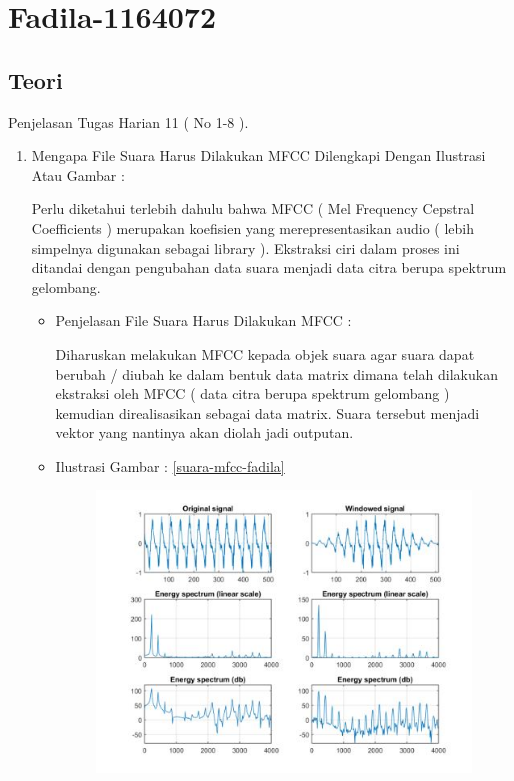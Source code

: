 \par
\par
\section{Fadila-1164072}
\subsection{Teori}
Penjelasan Tugas Harian 11 ( No 1-8 ).
\begin{enumerate}
\item Mengapa File Suara Harus Dilakukan MFCC Dilengkapi Dengan Ilustrasi Atau Gambar :
\par Perlu diketahui terlebih dahulu bahwa MFCC ( Mel Frequency Cepstral Coefficients ) merupakan koefisien yang merepresentasikan audio ( lebih simpelnya digunakan sebagai library ). Ekstraksi ciri dalam proses ini ditandai dengan pengubahan data suara menjadi data citra berupa spektrum gelombang.
\begin{itemize}
\item Penjelasan File Suara Harus Dilakukan MFCC : 
\par Diharuskan melakukan MFCC kepada objek suara agar suara dapat berubah / diubah ke dalam bentuk data matrix dimana telah dilakukan ekstraksi oleh MFCC ( data citra berupa spektrum gelombang ) kemudian direalisasikan sebagai data matrix. Suara tersebut menjadi vektor yang nantinya akan diolah jadi outputan.
\par
\item Ilustrasi Gambar : \ref{suara-mfcc-fadila}
\par
\begin{figure}[!hbtp]
\centering
\includegraphics[scale=0.2]{figures/suara-mfcc-fadila.jpg}

\end{figure}
\end{itemize}
\end{enumerate}
